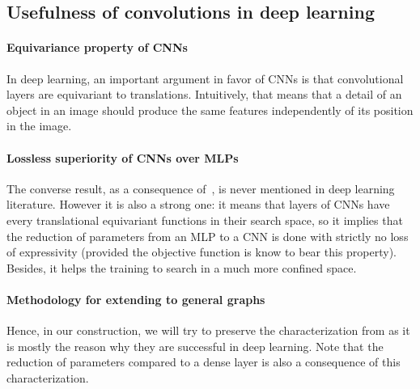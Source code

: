\subsection{Usefulness of convolutions in deep learning}
\label{sec:cnnvsmlp}

\paragraph{Equivariance property of CNNs}
In deep learning, an important argument in favor of CNNs is that convolutional layers are equivariant to translations. Intuitively, that means that a detail of an object in an image should produce the same features independently of its position in the image.

\paragraph{Lossless superiority of CNNs over MLPs}
The converse result, as a consequence of~, is never mentioned in deep learning literature. However it is also a strong one: it means that layers of CNNs have every translational equivariant functions in their search space, so it implies that the reduction of parameters from an MLP to a CNN is done with strictly no loss of expressivity (provided the objective function is know to bear this property). Besides, it helps the training to search in a much more confined space.

\paragraph{Methodology for extending to general graphs}
Hence, in our construction, we will try to preserve the characterization from  as it is mostly the reason why they are successful in deep learning. Note that the reduction of parameters compared to a dense layer is also a consequence of this characterization.







